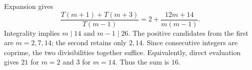 Expansion gives
\[
\dfrac{T(m+1)+T(m+3)}{T(m-1)}
=2+\dfrac{12m+14}{m(m-1)}.
\]
Integrality implies $m\mid14$ and $m-1\mid26$. The positive candidates from the first are $m=2,7,14$; the second retains only $2,14$. Since consecutive integers are coprime, the two divisibilities together suffice. Equivalently, direct evaluation gives $21$ for $m=2$ and $3$ for $m=14$. Thus the sum is $\boxed{16}$.
